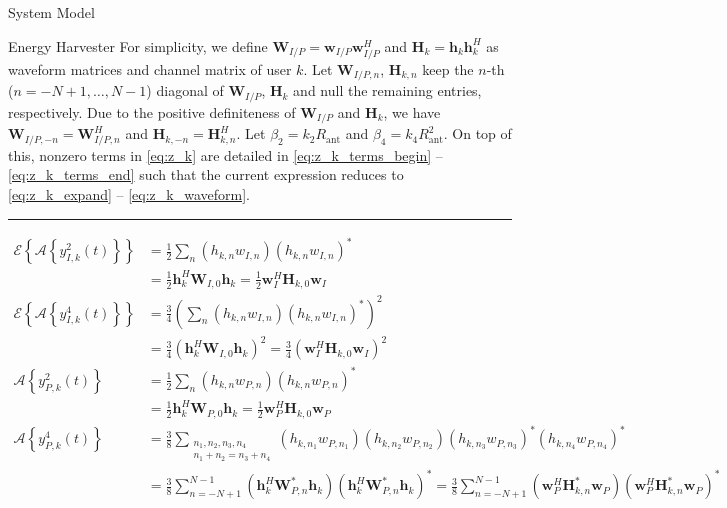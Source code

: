 \documentclass{IEEEtran}
\begin{document}
\begin{section}{System Model}
\begin{subsection}{Energy Harvester}
		For simplicity, we define $\boldsymbol{W}_{I/P}=\boldsymbol{w}_{I/P}\boldsymbol{w}_{I/P}^H$ and $\boldsymbol{H}_k=\boldsymbol{h}_k\boldsymbol{h}_k^H$ as waveform matrices and channel matrix of user $k$. Let $\boldsymbol{W}_{I/P,n}$, $\boldsymbol{H}_{k,n}$ keep the $n$-th ($n=-N+1,\dots,N-1$) diagonal of $\boldsymbol{W}_{I/P}$, $\boldsymbol{H}_k$ and null the remaining entries, respectively. Due to the positive definiteness of $\boldsymbol{W}_{I/P}$ and $\boldsymbol{H}_k$, we have $\boldsymbol{W}_{I/P,-n}=\boldsymbol{W}_{I/P,n}^H$ and $\boldsymbol{H}_{k,-n}=\boldsymbol{H}_{k,n}^H$. Let $\beta_2={k_2}{R_{\text{ant}}}$ and $\beta_4={k_4}{R_{\text{ant}}^2}$. On top of this, nonzero terms in \ref{eq:z_k} are detailed in \ref{eq:z_k_terms_begin} -- \ref{eq:z_k_terms_end} such that the current expression reduces to \ref{eq:z_k_expand} -- \ref{eq:z_k_waveform}.
		\begin{figure*}[b]
			\hrule
			\begin{align}
				\mathcal{E}\left\{\mathcal{A}\left\{y_{I,k}^2(t)\right\}\right\}
				& = \frac{1}{2}\sum_n{(h_{k,n}w_{I,n})(h_{k,n}w_{I,n})^*}\label{eq:z_k_terms_begin}\\
				& = \frac{1}{2}\boldsymbol{h}_k^H\boldsymbol{W}_{I,0}\boldsymbol{h}_k = \frac{1}{2}\boldsymbol{w}_I^H\boldsymbol{H}_{k,0}\boldsymbol{w}_I\\
				\mathcal{E}\left\{\mathcal{A}\left\{y_{I,k}^4(t)\right\}\right\}
				& = \frac{3}{4}\left(\sum_n{(h_{k,n}w_{I,n})(h_{k,n}w_{I,n})^*}\right)^2\\
				& = \frac{3}{4}(\boldsymbol{h}_k^H\boldsymbol{W}_{I,0}\boldsymbol{h}_k)^2 = \frac{3}{4}(\boldsymbol{w}_I^H\boldsymbol{H}_{k,0}\boldsymbol{w}_I)^2\\
				\mathcal{A}\left\{y_{P,k}^2(t)\right\}
				& = \frac{1}{2}\sum_n{(h_{k,n}w_{P,n})(h_{k,n}w_{P,n})^*}\\
				& = \frac{1}{2}\boldsymbol{h}_k^H\boldsymbol{W}_{P,0}\boldsymbol{h}_k = \frac{1}{2}\boldsymbol{w}_P^H\boldsymbol{H}_{k,0}\boldsymbol{w}_P\\
				\mathcal{A}\left\{y_{P,k}^4(t)\right\}
				& = \frac{3}{8}\sum_{\substack{{n_1},{n_2},{n_3},{n_4}\\{n_1}+{n_2}={n_3}+{n_4}}}{(h_{k,{n_1}}w_{P,{n_1}})(h_{k,{n_2}}w_{P,{n_2}})(h_{k,{n_3}}w_{P,{n_3}})^*(h_{k,{n_4}}w_{P,{n_4}})^*}\\
				& = \frac{3}{8}\sum_{n=-N+1}^{N-1}(\boldsymbol{h}_k^H\boldsymbol{W}_{P,n}^*\boldsymbol{h}_k)(\boldsymbol{h}_k^H\boldsymbol{W}_{P,n}^*\boldsymbol{h}_k)^* = \frac{3}{8}\sum_{n=-N+1}^{N-1}(\boldsymbol{w}_P^H\boldsymbol{H}_{k,n}^*\boldsymbol{w}_P)(\boldsymbol{w}_P^H\boldsymbol{H}_{k,n}^*\boldsymbol{w}_P)^*\label{eq:z_k_terms_end}

\end{align}
\end{figure*}
\end{subsection}
\end{section}
\end{document}
